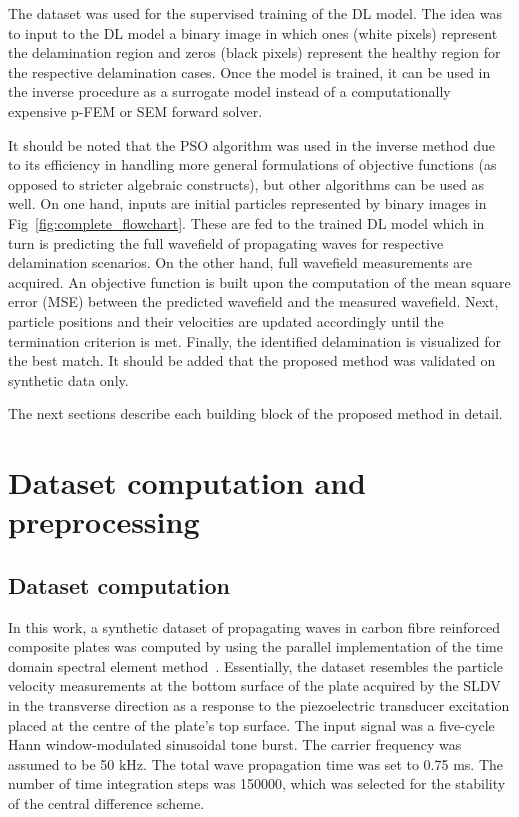 \documentclass[sn-mathphys-num]{sn-jnl}%
\begin{document}
	The dataset was used for the supervised training of the DL model.
	The idea was to input to the DL model a binary image in which ones (white 
	pixels) represent  the delamination region and zeros (black pixels) 
	represent the healthy region for the respective delamination cases.
	Once the model is trained, it can be used in the inverse procedure as a 
	surrogate model instead of a computationally expensive p-FEM or SEM forward 
	solver.
	
	It should be noted that the PSO algorithm was used in the inverse method 
	due to its efficiency in handling more general formulations of objective 
	functions (as opposed to stricter algebraic constructs), but other 
	algorithms can be used as well. 
	On one hand, inputs are initial particles represented by binary images in 
	Fig~\ref{fig:complete_flowchart}.
	These are fed to the trained DL model which in turn is predicting the full 
	wavefield of propagating waves for respective delamination scenarios.
	On the other hand, full wavefield measurements are acquired. 
	An objective function is built upon the computation of the mean square 
	error (MSE) between the predicted wavefield and the measured wavefield.
	Next, particle positions and their velocities are updated accordingly until 
	the termination criterion is met.
	Finally, the identified delamination is visualized for the best match.
	It should be added that the proposed method was validated on synthetic data 
	only. 
	
	The next sections describe each building block of the proposed method in 
	detail.
	\section{Dataset computation and preprocessing}\label{sec3}
	\subsection{Dataset computation}\label{subsec1}
	In this work, a synthetic dataset of propagating waves in carbon fibre 
	reinforced composite plates was computed by using the parallel 
	implementation of the time domain spectral element 
	method~\cite{Kudela2020}. 
	Essentially, the dataset resembles the particle velocity measurements at 
	the bottom surface of the plate acquired by the SLDV in the transverse 
	direction as a response to the piezoelectric transducer excitation placed 
	at the centre of the plate's top surface. 
	The input signal was a five-cycle Hann window-modulated sinusoidal tone 
	burst. 
	The carrier frequency was assumed to be 50 kHz. 
	The total wave propagation time was set to 0.75 ms.
	The number of time integration steps was 150000, which was selected for the 
	stability of the central difference scheme.
	
\end{document}
